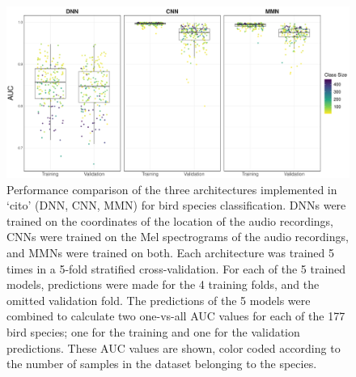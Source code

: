 \documentclass[12pt,twoside]{scrreport}
\newcommand{\pkg}[1]{`#1'}
\begin{document}
\begin{figure}[h]
	\centering
	\resizebox{\textwidth}{!}{\usebox{\dnn}}
\end{figure}

\begin{figure}[h!]
	\includegraphics[width=\textwidth]{../analysis/results/figures/auc_beehive.pdf}
	\caption{Performance comparison of the three architectures implemented in \pkg{cito} (DNN, CNN, MMN) for bird species classification. DNNs were trained on the coordinates of the location of the audio recordings, CNNs were trained on the Mel spectrograms of the audio recordings, and MMNs were trained on both. Each architecture was trained 5 times in a 5-fold stratified cross-validation. For each of the 5 trained models, predictions were made for the 4 training folds, and the omitted validation fold. The predictions of the 5 models were combined to calculate two one-vs-all AUC values for each of the 177 bird species; one for the training and one for the validation predictions. These AUC values are shown, color coded according to the number of samples in the dataset belonging to the species.}
	\label{beehive}
	\vspace{1cm}
	\resizebox{\textwidth}{!}{\usebox{\cnn}}
	\newpage
\end{figure}

\end{document}
